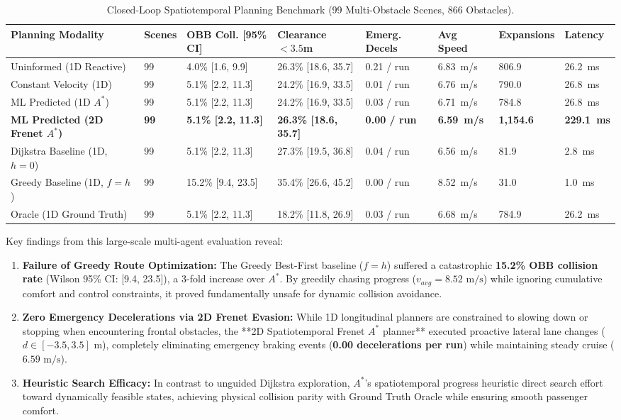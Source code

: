 \documentclass[runningheads]{llncs}
\begin{document}
\begin{table}[t]
\caption{Closed-Loop Spatiotemporal Planning Benchmark (99 Multi-Obstacle Scenes, 866 Obstacles).}
\label{tab:planning_benchmark}
\centering
\begin{tabularx}{\textwidth}{lXXXXXXX}
\toprule
\textbf{Planning Modality} & \textbf{Scenes} & \textbf{OBB Coll. [95\% CI]} & \textbf{Clearance $<3.5$m} & \textbf{Emerg. Decels} & \textbf{Avg Speed} & \textbf{Expansions} & \textbf{Latency} \\
\midrule
Uninformed (1D Reactive) & 99 & 4.0\% [1.6, 9.9] & 26.3\% [18.6, 35.7] & 0.21 / run & 6.83~m/s & 806.9 & 26.2~ms \\
Constant Velocity (1D) & 99 & 5.1\% [2.2, 11.3] & 24.2\% [16.9, 33.5] & 0.01 / run & 6.76~m/s & 790.0 & 26.8~ms \\
ML Predicted (1D $A^*$) & 99 & 5.1\% [2.2, 11.3] & 24.2\% [16.9, 33.5] & 0.03 / run & 6.71~m/s & 784.8 & 26.8~ms \\
\textbf{ML Predicted (2D Frenet $A^*$)} & \textbf{99} & \textbf{5.1\% [2.2, 11.3]} & \textbf{26.3\% [18.6, 35.7]} & \textbf{0.00 / run} & \textbf{6.59~m/s} & \textbf{1,154.6} & \textbf{229.1~ms} \\
Dijkstra Baseline (1D, $h=0$) & 99 & 5.1\% [2.2, 11.3] & 27.3\% [19.5, 36.8] & 0.04 / run & 6.56~m/s & 81.9 & 2.8~ms \\
Greedy Baseline (1D, $f=h$) & 99 & 15.2\% [9.4, 23.5] & 35.4\% [26.6, 45.2] & 0.00 / run & 8.52~m/s & 31.0 & 1.0~ms \\
Oracle (1D Ground Truth) & 99 & 5.1\% [2.2, 11.3] & 18.2\% [11.8, 26.9] & 0.03 / run & 6.68~m/s & 784.9 & 26.2~ms \\
\bottomrule
\end{tabularx}
\end{table}

Key findings from this large-scale multi-agent evaluation reveal:
\begin{enumerate}
    \item \textbf{Failure of Greedy Route Optimization:} The Greedy Best-First baseline ($f = h$) suffered a catastrophic \textbf{15.2\% OBB collision rate} (Wilson 95\% CI: [9.4, 23.5]), a 3-fold increase over $A^*$. By greedily chasing progress ($v_{avg} = 8.52\text{ m/s}$) while ignoring cumulative comfort and control constraints, it proved fundamentally unsafe for dynamic collision avoidance.
    \item \textbf{Zero Emergency Decelerations via 2D Frenet Evasion:} While 1D longitudinal planners are constrained to slowing down or stopping when encountering frontal obstacles, the **2D Spatiotemporal Frenet $A^*$ planner** executed proactive lateral lane changes ($d \in [-3.5, 3.5]\text{ m}$), completely eliminating emergency braking events (\textbf{0.00 decelerations per run}) while maintaining steady cruise ($6.59\text{ m/s}$).
    \item \textbf{Heuristic Search Efficacy:} In contrast to unguided Dijkstra exploration, $A^*$'s spatiotemporal progress heuristic direct search effort toward dynamically feasible states, achieving physical collision parity with Ground Truth Oracle while ensuring smooth passenger comfort.
\end{enumerate}
\end{document}
